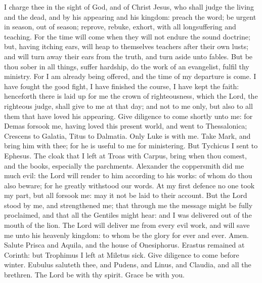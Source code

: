 I charge thee in the sight of God, and of Christ Jesus, who shall judge the living and the dead, and by his appearing and his kingdom: preach the word; be urgent in season, out of season; reprove, rebuke, exhort, with all longsuffering and teaching. For the time will come when they will not endure the sound doctrine; but, having itching ears, will heap to themselves teachers after their own lusts; and will turn away their ears from the truth, and turn aside unto fables. But be thou sober in all things, suffer hardship, do the work of an evangelist, fulfil thy ministry. For I am already being offered, and the time of my departure is come. I have fought the good fight, I have finished the course, I have kept the faith: henceforth there is laid up for me the crown of righteousness, which the Lord, the righteous judge, shall give to me at that day; and not to me only, but also to all them that have loved his appearing.  Give diligence to come shortly unto me: for Demas forsook me, having loved this present world, and went to Thessalonica; Crescens to Galatia, Titus to Dalmatia. Only Luke is with me. Take Mark, and bring him with thee; for he is useful to me for ministering. But Tychicus I sent to Ephesus. The cloak that I left at Troas with Carpus, bring when thou comest, and the books, especially the parchments. Alexander the coppersmith did me much evil: the Lord will render to him according to his works: of whom do thou also beware; for he greatly withstood our words. At my first defence no one took my part, but all forsook me: may it not be laid to their account. But the Lord stood by me, and strengthened me; that through me the message might be fully proclaimed, and that all the Gentiles might hear: and I was delivered out of the mouth of the lion. The Lord will deliver me from every evil work, and will save me unto his heavenly kingdom: to whom be the glory for ever and ever. Amen.  Salute Prisca and Aquila, and the house of Onesiphorus. Erastus remained at Corinth: but Trophimus I left at Miletus sick. Give diligence to come before winter. Eubulus saluteth thee, and Pudens, and Linus, and Claudia, and all the brethren.  The Lord be with thy spirit. Grace be with you. 